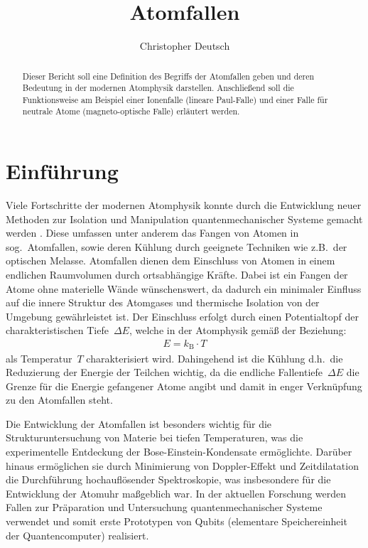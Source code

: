 \documentclass[twocolumn]{revtex4}
\begin{document}
\title{Atomfallen}

\author{Christopher Deutsch}




\begin{abstract}
%
Dieser Bericht soll eine Definition des Begriffs der Atomfallen geben und deren Bedeutung in der modernen Atomphysik darstellen. Anschließend soll die Funktionsweise am Beispiel einer Ionenfalle (lineare Paul-Falle) und einer Falle für neutrale Atome (magneto-optische Falle) erläutert werden.
%
\end{abstract}

\maketitle

\section{Einführung}
Viele Fortschritte der modernen Atomphysik konnte durch die Entwicklung neuer Methoden zur Isolation und Manipulation quantenmechanischer Systeme gemacht werden \cite{trapping}.
Diese umfassen unter anderem das Fangen von Atomen in sog.~Atomfallen, sowie deren Kühlung durch geeignete Techniken wie z.B.\ der optischen Melasse.
Atomfallen dienen dem Einschluss von Atomen in einem endlichen Raumvolumen durch ortsabhängige Kräfte. 
Dabei ist ein Fangen der Atome ohne materielle Wände wünschenswert, da dadurch ein minimaler Einfluss auf die innere Struktur des Atomgases und thermische Isolation von der Umgebung gewährleistet ist.
Der Einschluss erfolgt durch einen Potentialtopf der charakteristischen Tiefe~$\Delta E$, welche in der Atomphysik gemäß der Beziehung:
\begin{align*}
	E = k_\mathrm{B} \cdot T
\end{align*}
als Temperatur~$T$ charakterisiert wird.
Dahingehend ist die Kühlung d.h.\ die Reduzierung der Energie der Teilchen wichtig, da die endliche Fallentiefe~$\Delta E$ die Grenze für die Energie gefangener Atome angibt und damit in enger Verknüpfung zu den Atomfallen steht.

Die Entwicklung der Atomfallen ist besonders wichtig für die Strukturuntersuchung von Materie bei tiefen Temperaturen, was die experimentelle Entdeckung der Bose-Einstein-Kondensate ermöglichte.
Darüber hinaus ermöglichen sie durch Minimierung von Doppler-Effekt und Zeitdilatation die Durchführung hochauflösender Spektroskopie, was insbesondere für die Entwicklung der Atomuhr maßgeblich war.
In der aktuellen Forschung werden Fallen zur Präparation und Untersuchung quantenmechanischer Systeme verwendet und somit erste Prototypen von Qubits (elementare Speichereinheit der Quantencomputer) realisiert.
\end{document}
